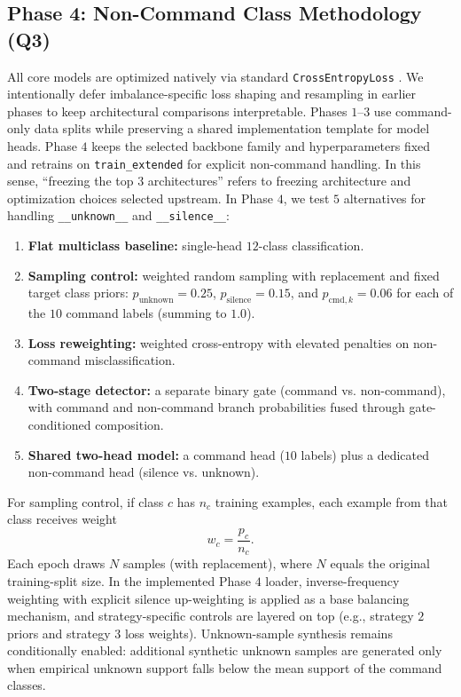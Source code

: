 \documentclass[cameraready]{Interspeech}
\begin{document}
\subsection{Phase 4: Non-Command Class Methodology (Q3)}
All core models are optimized natively via standard \texttt{CrossEntropyLoss} \cite{goodfellow2016deep}. We intentionally defer imbalance-specific loss shaping and resampling in earlier phases to keep architectural comparisons interpretable. Phases $1$--$3$ use command-only data splits while preserving a shared implementation template for model heads. Phase $4$ keeps the selected backbone family and hyperparameters fixed and retrains on \texttt{train\_extended} for explicit non-command handling. In this sense, ``freezing the top $3$ architectures'' refers to freezing architecture and optimization choices selected upstream. In Phase $4$, we test $5$ alternatives for handling \texttt{\_\_unknown\_\_} and \texttt{\_\_silence\_\_}:

\begin{enumerate}
    \item \textbf{Flat multiclass baseline:} single-head $12$-class classification.
    \item \textbf{Sampling control:} weighted random sampling with replacement and fixed target class priors: $p_{\mathrm{unknown}}=0.25$, $p_{\mathrm{silence}}=0.15$, and $p_{\mathrm{cmd},k}=0.06$ for each of the $10$ command labels (summing to $1.0$).
    \item \textbf{Loss reweighting:} weighted cross-entropy with elevated penalties on non-command misclassification.
    \item \textbf{Two-stage detector:} a separate binary gate (command vs. non-command), with command and non-command branch probabilities fused through gate-conditioned composition.
    \item \textbf{Shared two-head model:} a command head ($10$ labels) plus a dedicated non-command head (silence vs. unknown).
\end{enumerate}

For sampling control, if class $c$ has $n_c$ training examples, each example from that class receives weight
$$
w_c = \frac{p_c}{n_c}.
$$
Each epoch draws $N$ samples (with replacement), where $N$ equals the original training-split size. In the implemented Phase $4$ loader, inverse-frequency weighting with explicit silence up-weighting is applied as a base balancing mechanism, and strategy-specific controls are layered on top (e.g., strategy $2$ priors and strategy $3$ loss weights). Unknown-sample synthesis remains conditionally enabled: additional synthetic unknown samples are generated only when empirical unknown support falls below the mean support of the command classes.
\end{document}
